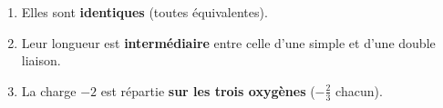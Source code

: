 \documentclass[11pt,a4paper]{article}
\begin{document}
\begin{corrige}
\begin{enumerate}[label=\alph*)]
  \item Elles sont \textbf{identiques} (toutes équivalentes).
  \item Leur longueur est \textbf{intermédiaire} entre celle d'une simple et d'une double liaison.
  \item La charge $-2$ est répartie \textbf{sur les trois oxygènes} ($-\tfrac{2}{3}$ chacun).
\end{enumerate}
\end{corrige}
\end{document}
